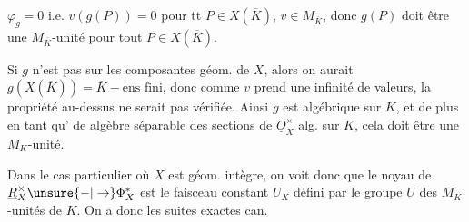 $\varphi_g=0$ i.e. $v(g(P))=0$ pour tt $P\in X(\overline K)$, $v\in M_{\overline K}$, donc $g(P)$ doit être une $M_{\overline K}$-unité pour tout $P\in X(\overline K)$.

Si $g$ n'est pas  sur les composantes   géom. de $X$, alors  on aurait $g(X(\overline K))=\overline K-\text{ens fini}$, donc  comme $v$  prend une infinité de valeurs, la propriété au-dessus ne serait pas vérifiée. Ainsi $g$ est algébrique sur $K$, et de plus en tant qu' de algèbre séparable des sections  de $\underline O_X^{\times}$ alg. sur $K$, cela doit être une $M_K$-\uline{unité}.

Dans le cas particulier où $X$ est géom. intègre, on voit donc que le noyau de $\underline R_X^{\times}\unsure{-|\to}\Phi_X^*$ est le faisceau  constant $U_X$ défini par le groupe $U$ des $M_K$-unités de $K$. On a donc les suites exactes can.
